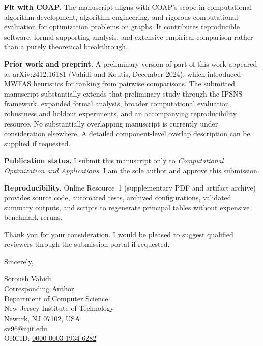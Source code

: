 \documentclass[11pt]{article}
\begin{document}
\textbf{Fit with COAP.} The manuscript aligns with COAP's scope in computational algorithm development, algorithm engineering, and rigorous computational evaluation for optimization problems on graphs. It contributes reproducible software, formal supporting analysis, and extensive empirical comparison rather than a purely theoretical breakthrough.

\textbf{Prior work and preprint.} A preliminary version of part of this work appeared as arXiv:2412.16181 (Vahidi and Koutis, December 2024), which introduced MWFAS heuristics for ranking from pairwise comparisons. The submitted manuscript substantially extends that preliminary study through the IPSNS framework, expanded formal analysis, broader computational evaluation, robustness and holdout experiments, and an accompanying reproducibility resource. No substantially overlapping manuscript is currently under consideration elsewhere. A detailed component-level overlap description can be supplied if requested.

\textbf{Publication status.} I submit this manuscript only to \textit{Computational Optimization and Applications}. I am the sole author and approve this submission.

\textbf{Reproducibility.} Online Resource~1 (supplementary PDF and artifact archive) provides source code, automated tests, archived configurations, validated summary outputs, and scripts to regenerate principal tables without expensive benchmark reruns.

Thank you for your consideration. I would be pleased to suggest qualified reviewers through the submission portal if requested.

\vspace{1em}
\noindent
Sincerely,

\vspace{1.5em}
\noindent
Soroush Vahidi\\
Corresponding Author\\
Department of Computer Science\\
New Jersey Institute of Technology\\
Newark, NJ 07102, USA\\
\href{mailto:sv96@njit.edu}{sv96@njit.edu}\\
ORCID: \href{https://orcid.org/0000-0003-1934-6282}{0000-0003-1934-6282}
\end{document}
